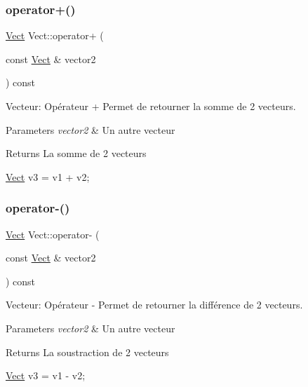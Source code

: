 \subsubsection{\texorpdfstring{operator+()}{operator+()}}
{\footnotesize\ttfamily \hyperlink{classVect}{Vect} Vect\+::operator+ (\begin{DoxyParamCaption}\item[{const \hyperlink{classVect}{Vect} \&}]{vector2 }\end{DoxyParamCaption}) const}



Vecteur\+: Opérateur + Permet de retourner la somme de 2 vecteurs. 


\begin{DoxyParams}{Parameters}
{\em vector2} & Un autre vecteur \\
\hline
\end{DoxyParams}
\begin{DoxyReturn}{Returns}
La somme de 2 vecteurs 
\begin{DoxyCode}
\hyperlink{classVect}{Vect} v3 = v1 + v2;
\end{DoxyCode}
 
\end{DoxyReturn}
\mbox{\label{classVect_a6d4d06eb29739cfc9ab0a658ba534254}} 
\subsubsection{\texorpdfstring{operator-\/()}{operator-()}}
{\footnotesize\ttfamily \hyperlink{classVect}{Vect} Vect\+::operator-\/ (\begin{DoxyParamCaption}\item[{const \hyperlink{classVect}{Vect} \&}]{vector2 }\end{DoxyParamCaption}) const}



Vecteur\+: Opérateur -\/ Permet de retourner la différence de 2 vecteurs. 


\begin{DoxyParams}{Parameters}
{\em vector2} & Un autre vecteur \\
\hline
\end{DoxyParams}
\begin{DoxyReturn}{Returns}
La soustraction de 2 vecteurs 
\begin{DoxyCode}
\hyperlink{classVect}{Vect} v3 = v1 - v2;
\end{DoxyCode}
 
\end{DoxyReturn}
\mbox{\label{classVect_a08e7e684ad85024233a59aff86eb5c83}} 

